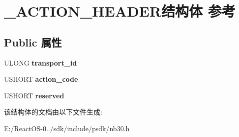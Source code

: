 \hypertarget{struct___a_c_t_i_o_n___h_e_a_d_e_r}{}\section{\+\_\+\+A\+C\+T\+I\+O\+N\+\_\+\+H\+E\+A\+D\+E\+R结构体 参考}
\label{struct___a_c_t_i_o_n___h_e_a_d_e_r}
\subsection*{Public 属性}
\begin{DoxyCompactItemize}
\item 
\mbox{\label{struct___a_c_t_i_o_n___h_e_a_d_e_r_af100127e9f650c4bd35cf67acb70defd}} 
U\+L\+O\+NG {\bfseries transport\+\_\+id}
\item 
\mbox{\label{struct___a_c_t_i_o_n___h_e_a_d_e_r_adfb18602ce4f65f39642140860b74a52}} 
U\+S\+H\+O\+RT {\bfseries action\+\_\+code}
\item 
\mbox{\label{struct___a_c_t_i_o_n___h_e_a_d_e_r_a16db59e29525faaeee1e43824b107e50}} 
U\+S\+H\+O\+RT {\bfseries reserved}
\end{DoxyCompactItemize}


该结构体的文档由以下文件生成\+:\begin{DoxyCompactItemize}
\item 
E\+:/\+React\+O\+S-\/0../sdk/include/psdk/nb30.\+h\end{DoxyCompactItemize}
